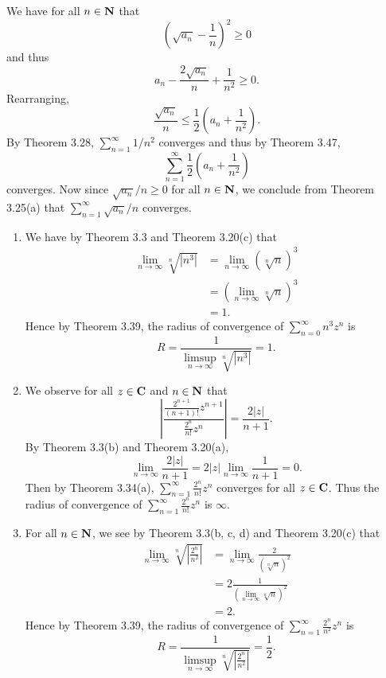 \begin{ex}
We have for all $n \in \mathbf{N}$ that \[\left(\sqrt{a_n} - \frac{1}{n}\right)^2 \geq 0\] and thus \[a_n - \frac{2\sqrt{a_n}}{n} + \frac{1}{n^2} \geq 0.\] Rearranging, \[\frac{\sqrt{a_n}}{n} \leq \frac{1}{2}\left(a_n + \frac{1}{n^2}\right).\] By Theorem 3.28, $\sum_{n = 1}^{\infty}1/n^2$ converges and thus by Theorem 3.47, \[\sum_{n = 1}^{\infty}\frac{1}{2}\left(a_n + \frac{1}{n^2}\right)\] converges. Now since $\sqrt{a_n}/n \geq 0$ for all $n \in \mathbf{N}$, we conclude from Theorem 3.25(a) that $\sum_{n = 1}^{\infty}\sqrt{a_n}/n$ converges.
\end{ex}

\begin{ex}

\end{ex}

\begin{ex}
\begin{enumerate}
\item We have by Theorem 3.3 and Theorem 3.20(c) that
\begin{align*}
\lim_{n\to\infty}\sqrt[n]{|n^3|} & = \lim_{n\to\infty}(\sqrt[n]{n})^3\\
& = \left(\lim_{n\to\infty}\sqrt[n]{n}\right)^3\\
& = 1.
\end{align*}
Hence by Theorem 3.39, the radius of convergence of $\sum_{n = 0}^{\infty}n^3z^n$ is \[R = \frac{1}{\limsup_{n\to\infty}\sqrt[n]{|n^3|}} = 1.\]

\item We observe for all $z \in \mathbf{C}$ and $n \in \mathbf{N}$ that \[\left|\frac{\frac{2^{n+1}}{(n+1)!}z^{n+1}}{\frac{2^n}{n!}z^n}\right| = \frac{2|z|}{n+1}.\] By Theorem 3.3(b) and Theorem 3.20(a), \[\lim_{n\to\infty}\frac{2|z|}{n+1} = 2|z|\lim_{n\to\infty}\frac{1}{n+1} = 0.\] Then by Theorem 3.34(a), $\sum_{n=1}^{\infty}\frac{2^n}{n!}z^n$ converges for all $z \in \mathbf{C}$. Thus the radius of convergence of $\sum_{n=1}^{\infty}\frac{2^n}{n!}z^n$ is $\infty$.

\item For all $n \in \mathbf{N}$, we see by Theorem 3.3(b, c, d) and Theorem 3.20(c) that
\begin{align*}
\lim_{n\to\infty}\sqrt[n]{\left|\frac{2^n}{n^2}\right|} & = \lim_{n\to\infty}\frac{2}{(\sqrt[n]{n})^2}\\
& = 2\frac{1}{\left(\lim_{n\to\infty}\sqrt[n]{n}\right)^2}\\
& = 2.
\end{align*}
Hence by Theorem 3.39, the radius of convergence of $\sum_{n = 1}^{\infty}\frac{2^n}{n^2}z^n$ is \[R = \frac{1}{\limsup_{n\to\infty}\sqrt[n]{\left|\frac{2^n}{n^2}\right|}} = \frac{1}{2}.\]


\end{enumerate}
\end{ex}
